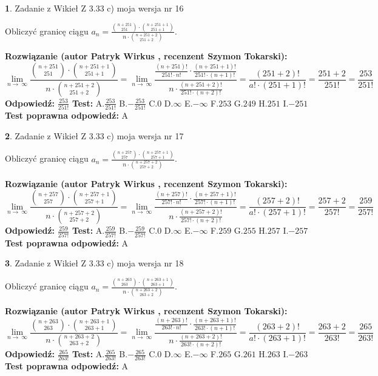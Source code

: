 \documentclass[12pt, a4paper]{article}
\theoremstyle{definition} %
\newtheorem{zad}{}
\newcommand{\zadStart}[1]{\begin{zad}#1\newline}
\newcommand{\zadStop}{\end{zad}}
\newcommand{\rozwStart}[2]{\noindent \textbf{Rozwiązanie (autor #1 , recenzent #2): }\newline}
\newcommand{\rozwStop}{\newline}
\newcommand{\odpStart}{\noindent \textbf{Odpowiedź:}\newline}
\newcommand{\odpStop}{\newline}
\newcommand{\testStart}{\noindent \textbf{Test:}\newline}
\newcommand{\testStop}{\newline}
\newcommand{\kluczStart}{\noindent \textbf{Test poprawna odpowiedź:}\newline}
\newcommand{\kluczStop}{\newline}
\begin{document}
\zadStart{Zadanie z Wikieł Z 3.33 c) moja wersja nr 16}

Obliczyć granicę ciągu $a_{n}=\frac{{n+251\choose251}\cdot{n+251+1\choose251+1}}{n\cdot{n+251+2\choose251+2}}$.
\zadStop
\rozwStart{Patryk Wirkus}{Szymon Tokarski}
$$\lim\limits_{n\to\ \infty}\frac{{n+251\choose251}\cdot{n+251+1\choose251+1}}{n\cdot{n+251+2\choose251+2}} = \lim\limits_{n\to\ \infty}\frac{\frac{(n+251)!}{251! \cdot n!}\cdot \frac{(n+251+1)!}{251! \cdot (n+1)!}}{n\cdot \frac{(n+251+2)!}{251! \cdot (n+2)!}} = \frac{(251+2)!}{a!\cdot (251+1)!} = \frac{251+2}{251!} = \frac{253}{251!}$$
\rozwStop
\odpStart
$\frac{253}{251!}$
\odpStop
\testStart
A.$\frac{253}{251!}$ B.$-\frac{253}{251!}$ C.$0$ D.$\infty$ E.$-\infty$
F.$253$ G.$249$
H.$251$
I.$-251$
\testStop
\kluczStart
A
\kluczStop



\zadStart{Zadanie z Wikieł Z 3.33 c) moja wersja nr 17}

Obliczyć granicę ciągu $a_{n}=\frac{{n+257\choose257}\cdot{n+257+1\choose257+1}}{n\cdot{n+257+2\choose257+2}}$.
\zadStop
\rozwStart{Patryk Wirkus}{Szymon Tokarski}
$$\lim\limits_{n\to\ \infty}\frac{{n+257\choose257}\cdot{n+257+1\choose257+1}}{n\cdot{n+257+2\choose257+2}} = \lim\limits_{n\to\ \infty}\frac{\frac{(n+257)!}{257! \cdot n!}\cdot \frac{(n+257+1)!}{257! \cdot (n+1)!}}{n\cdot \frac{(n+257+2)!}{257! \cdot (n+2)!}} = \frac{(257+2)!}{a!\cdot (257+1)!} = \frac{257+2}{257!} = \frac{259}{257!}$$
\rozwStop
\odpStart
$\frac{259}{257!}$
\odpStop
\testStart
A.$\frac{259}{257!}$ B.$-\frac{259}{257!}$ C.$0$ D.$\infty$ E.$-\infty$
F.$259$ G.$255$
H.$257$
I.$-257$
\testStop
\kluczStart
A
\kluczStop



\zadStart{Zadanie z Wikieł Z 3.33 c) moja wersja nr 18}

Obliczyć granicę ciągu $a_{n}=\frac{{n+263\choose263}\cdot{n+263+1\choose263+1}}{n\cdot{n+263+2\choose263+2}}$.
\zadStop
\rozwStart{Patryk Wirkus}{Szymon Tokarski}
$$\lim\limits_{n\to\ \infty}\frac{{n+263\choose263}\cdot{n+263+1\choose263+1}}{n\cdot{n+263+2\choose263+2}} = \lim\limits_{n\to\ \infty}\frac{\frac{(n+263)!}{263! \cdot n!}\cdot \frac{(n+263+1)!}{263! \cdot (n+1)!}}{n\cdot \frac{(n+263+2)!}{263! \cdot (n+2)!}} = \frac{(263+2)!}{a!\cdot (263+1)!} = \frac{263+2}{263!} = \frac{265}{263!}$$
\rozwStop
\odpStart
$\frac{265}{263!}$
\odpStop
\testStart
A.$\frac{265}{263!}$ B.$-\frac{265}{263!}$ C.$0$ D.$\infty$ E.$-\infty$
F.$265$ G.$261$
H.$263$
I.$-263$
\testStop
\kluczStart
A
\kluczStop
\end{document}
